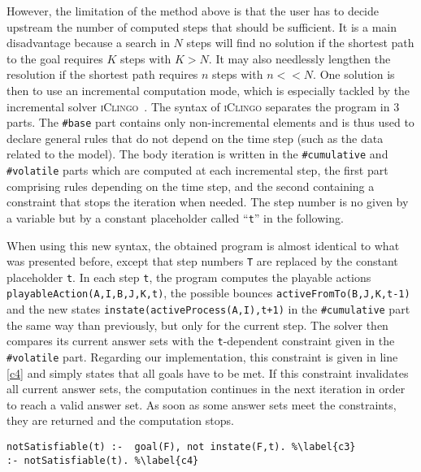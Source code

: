 However, the limitation of the method above is that the user has to decide upstream
the number of computed steps that should be sufficient.
It is a main disadvantage because a search in $N$ steps will find no solution
if the shortest path to the goal requires $K$ steps with $K > N$.
It may also needlessly lengthen the resolution if the shortest path requires $n$ steps with $n << N$.
One solution is then to use an incremental computation mode,
which is especially tackled by the incremental solver \textsc{iClingo}~\cite{gebser2008user}.
The syntax of \textsc{iClingo} separates the program in 3 parts.
The \texttt{\#base} part contains only non-incremental elements
and is thus used to declare general rules
that do not depend on the time step (such as the data related to the model).
The body iteration is written in the
\texttt{\#cumulative} and \texttt{\#volatile} parts
which are computed at each incremental step,
the first part comprising rules depending on the time step,
and the second containing a constraint that stops the iteration when needed.
The step number is no given by a variable but by a constant placeholder
called “\texttt{t}” in the following.

When using this new syntax, the obtained program is almost identical
to what was presented before,
except that step numbers \texttt{T}
are replaced by the constant placeholder \texttt{t}.
In each step \texttt{t}, the program computes the playable actions \texttt{playableAction(A,I,B,J,K,t)}, the possible bounces \texttt{activeFromTo(B,J,K,t-1)}
and the new states \texttt{instate(activeProcess(A,I),t+1)}
in the \texttt{\#cumulative} part
the same way than previously, but only for the current step.
The solver then compares its current answer sets with
the \texttt{t}-dependent constraint given in the \texttt{\#volatile} part.
Regarding our implementation, this constraint is given in line \ref{c4}
and simply states that all goals have to be met.
If this constraint invalidates all current answer sets,
the computation continues in the next iteration in order to reach a valid answer set.
As soon as some answer sets meet the constraints,
they are returned and the computation stops.
\begin{lstlisting}
notSatisfiable(t) :-  goal(F), not instate(F,t). %\label{c3}
:- notSatisfiable(t). %\label{c4}
\end{lstlisting}
